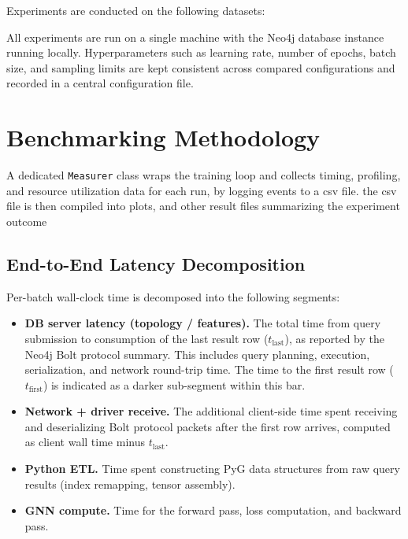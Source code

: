 Experiments are conducted on the following datasets:

All experiments are run on a single machine with the Neo4j database instance running
locally. Hyperparameters such as learning rate, number of epochs, batch size, and
sampling limits are kept consistent across compared configurations and recorded in a
central configuration file.


\section{Benchmarking Methodology}\label{sec:benchmarking}

A dedicated \texttt{Measurer} class wraps the training loop and collects timing,
profiling, and resource utilization data for each run, by logging events to a csv file. the 
csv file is then compiled into plots, and other result files summarizing the experiment outcome


\subsection{End-to-End Latency Decomposition}\label{sec:e2e_latency}

Per-batch wall-clock time is decomposed into the following segments:

\begin{itemize}
    \item \textbf{DB server latency (topology / features).} The total time from query
    submission to consumption of the last result row ($t_{\text{last}}$), as reported
    by the Neo4j Bolt protocol summary. This includes query planning, execution,
    serialization, and network round-trip time. The time to the first result row
    ($t_{\text{first}}$) is indicated as a darker sub-segment within this bar.

    \item \textbf{Network + driver receive.} The additional client-side time spent
    receiving and deserializing Bolt protocol packets after the first row arrives,
    computed as client wall time minus $t_{\text{last}}$.

    \item \textbf{Python ETL.} Time spent constructing PyG data structures from raw
    query results (index remapping, tensor assembly).

    \item \textbf{GNN compute.} Time for the forward pass, loss computation, and
    backward pass.
\end{itemize}


